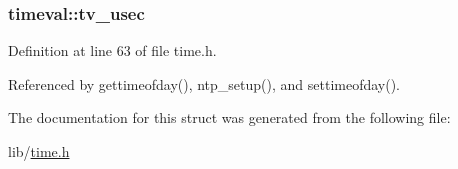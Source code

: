 \subsubsection[{\texorpdfstring{tv\+\_\+usec}{tv_usec}}]{ timeval\+::tv\+\_\+usec}\hypertarget{structtimeval_a8fd7abf5420981b3ff58bb23df458587}{}\label{structtimeval_a8fd7abf5420981b3ff58bb23df458587}


Definition at line 63 of file time.\+h.



Referenced by gettimeofday(), ntp\+\_\+setup(), and settimeofday().



The documentation for this struct was generated from the following file\+:\begin{DoxyCompactItemize}
\item 
lib/\hyperlink{time_8h}{time.\+h}\end{DoxyCompactItemize}
